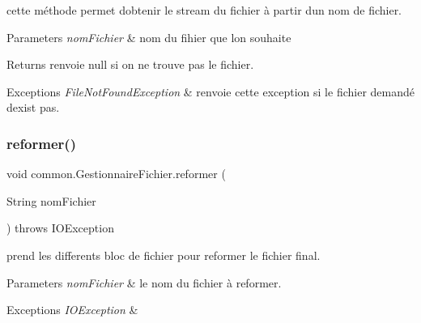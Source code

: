 cette méthode permet d\textquotesingle{}obtenir le stream du fichier à partir d\textquotesingle{}un nom de fichier. 


\begin{DoxyParams}{Parameters}
{\em nom\+Fichier} & nom du fihier que l\textquotesingle{}on souhaite \\
\hline
\end{DoxyParams}
\begin{DoxyReturn}{Returns}
renvoie null si on ne trouve pas le fichier. 
\end{DoxyReturn}

\begin{DoxyExceptions}{Exceptions}
{\em File\+Not\+Found\+Exception} & renvoie cette exception si le fichier demandé d\textquotesingle{}exist pas. \\
\hline
\end{DoxyExceptions}
\mbox{\label{classcommon_1_1GestionnaireFichier_af554d6cc45505271d3f393feb7b5e0f6}} 
\subsubsection{\texorpdfstring{reformer()}{reformer()}}
{\footnotesize\ttfamily void common.\+Gestionnaire\+Fichier.\+reformer (\begin{DoxyParamCaption}\item[{String}]{nom\+Fichier }\end{DoxyParamCaption}) throws I\+O\+Exception\hspace{0.3cm}{\ttfamily [inline]}}



prend les differents bloc de fichier pour reformer le fichier final. 


\begin{DoxyParams}{Parameters}
{\em nom\+Fichier} & le nom du fichier à reformer. \\
\hline
\end{DoxyParams}

\begin{DoxyExceptions}{Exceptions}
{\em I\+O\+Exception} & \\
\hline
\end{DoxyExceptions}
\mbox{\label{classcommon_1_1GestionnaireFichier_afc70adcceabf46a5721ff2b1149e2730}} 
